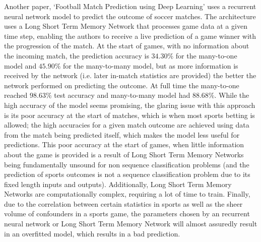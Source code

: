 \documentclass[10pt,twocolumn,letterpaper]{article}
\begin{document}
Another paper, `Football Match Prediction using Deep Learning' \cite{Pettersson} uses a recurrent neural network model to predict the outcome of soccer matches. The architecture  uses a Long Short Term Memory Network that processes game data at a given time step, enabling the authors to receive a live prediction of a game winner with the progression of the match. At the start of games, with no information about the incoming match, the prediction accuracy is $34.30\%$ for the many-to-one model and $45.90\%$ for the many-to-many model, but as more information is received by the network (i.e. later in-match statistics are provided) the better the network performed on predicting the outcome. At full time the many-to-one reached $98.63\%$ test accuracy and many-to-many model had $88.68\%$. While the high accuracy of the model seems promising, the glaring issue with this approach is its poor accuracy at the start of matches, which is when most sports betting is allowed; the high accuracies for a given match outcome are achieved using data from the match being predicted itself, which makes the model less useful for predictions. This poor accuracy at the start of games, when little information about the game is provided is a result of Long Short Term Memory Networks being fundamentally unsound for non sequence classification problems (and the prediction of sports outcomes is not a sequence classification problem due to its fixed length inputs and outputs). Additionally, Long Short Term Memory Networks are computationally complex, requiring a lot of time to train. Finally, due to the correlation between certain statistics in sports as well as the sheer volume of confounders in a sports game, the parameters chosen by an recurrent neural network or Long Short Term Memory Network will almost assuredly result in an overfitted model, which results in a bad prediction. \\
\end{document}
